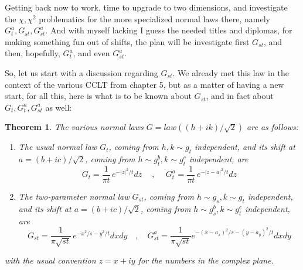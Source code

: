 \documentclass[12pt]{amsbook}
\newtheorem{theorem}{Theorem}[chapter]
\begin{document}
\bigskip

Getting back now to work, time to upgrade to two dimensions, and investigate the $\chi,\chi^2$ problematics for the more specialized normal laws there, namely $G_t^a,G_{st},G_{st}^a$. And with myself lacking I guess the needed titles and diplomas, for making something fun out of shifts, the plan will be investigate first $G_{st}$, and then, hopefully, $G_t^a$, and even $G_{st}^a$.

\bigskip

So, let us start with a discussion regarding $G_{st}$. We already met this law in the context of the various CCLT from chapter 5, but as a matter of having a new start, for all this, here is what is to be known about $G_{st}$, and in fact about $G_t,G_t^a,G_{st}^a$ as well:

\begin{theorem}
The various normal laws $G=law((h+ik)/\sqrt{2})$ are as follows:
\begin{enumerate}
\item The usual normal law $G_t$, coming from $h,k\sim g_t$ independent, and its shift at $a=(b+ic)/\sqrt{2}$, coming from $h\sim g_t^b,k\sim g_t^c$ independent, are
$$G_t=\frac{1}{\pi t}\,e^{-|z|^2/t}dz\quad\ ,\ \quad G_t^a=\frac{1}{\pi t}\,e^{-|z-a|^2/t}dz$$

\item The two-parameter normal law $G_{st}$, coming from $h\sim g_s,k\sim g_t$ independent, and its shift at $a=(b+ic)/\sqrt{2}$, coming from $h\sim g_s^b,k\sim g_t^c$ independent, are
$$G_{st}=\frac{1}{\pi\sqrt{st}}\,e^{-x^2/s-y^2/t}dxdy\quad,\quad G_{st}^a=\frac{1}{\pi\sqrt{st}}e^{-(x-a_x)^2/s-(y-a_y)^2/t}dxdy$$
\end{enumerate}
with the usual convention $z=x+iy$ for the numbers in the complex plane.
\end{theorem}
\end{document}
